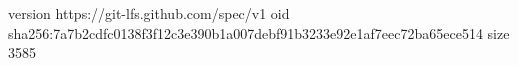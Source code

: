 version https://git-lfs.github.com/spec/v1
oid sha256:7a7b2cdfc0138f3f12c3e390b1a007debf91b3233e92e1af7eec72ba65ece514
size 3585
